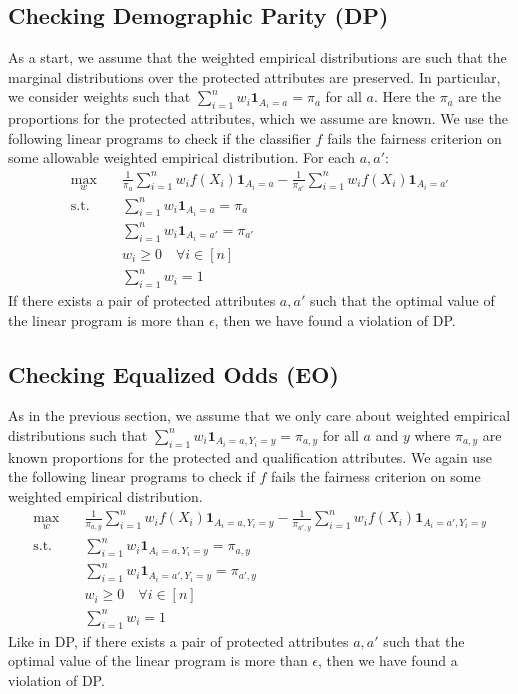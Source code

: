 \documentclass[11pt]{article}
\newcommand{\eye}{\mathbf{1}}
\begin{document}
\subsection{Checking Demographic Parity (DP)}
As a start, we assume that the weighted empirical distributions are such that the marginal distributions over the protected attributes are preserved. In particular, we consider weights such that $\sum_{i=1}^n w_i \eye_{A_i = a} = \pi_a$ for all $a$. Here the $\pi_a$ are the proportions for the protected attributes, which we assume are known. We use the following linear programs to check if the classifier $f$ fails the fairness criterion on some allowable weighted empirical distribution. For each $a, a'$:
\begin{equation}
\label{eq:checkdp}
\begin{aligned}
\max_w \quad & \frac{1}{\pi_a} \sum_{i=1}^n w_i f(X_i)\eye_{A_i = a} - \frac{1}{\pi_{a'}} \sum_{i=1}^n w_i f(X_i)\eye_{A_i = a'} \\
\textrm{s.t.} \quad & \sum_{i=1}^n w_i \eye_{A_i = a} = \pi_a \\
& \sum_{i=1}^n w_i \eye_{A_i = a'} = \pi_{a'} \\
& w_i \ge 0 \quad \forall i \in [n] \\
&\sum_{i=1}^n w_i = 1
\end{aligned}
\end{equation}
If there exists a pair of protected attributes $a,a'$ such that the optimal value of the linear program is more than $\epsilon$, then we have found a violation of DP.

\subsection{Checking Equalized Odds (EO)}
As in the previous section, we assume that we only care about weighted empirical distributions such that $\sum_{i=1}^n w_i \eye_{A_i = a, Y_i = y} = \pi_{a,y}$ for all $a$ and $y$ where $\pi_{a,y}$ are known proportions for the protected and qualification attributes. We again use the following linear programs to check if $f$ fails the fairness criterion on some weighted empirical distribution.
\begin{equation}
\label{eq:checkeo}
\begin{aligned}
\max_w \quad & \frac{1}{\pi_{a,y}} \sum_{i=1}^n w_i f(X_i)\eye_{A_i = a, Y_i = y} - \frac{1}{\pi_{a',y}} \sum_{i=1}^n w_i f(X_i)\eye_{A_i = a',Y_i = y} \\
\textrm{s.t.} \quad & \sum_{i=1}^n w_i \eye_{A_i = a, Y_i = y} = \pi_{a,y} \\
& \sum_{i=1}^n w_i \eye_{A_i = a', Y_i = y} = \pi_{a',y} \\
& w_i \ge 0 \quad \forall i \in [n] \\
&\sum_{i=1}^n w_i = 1
\end{aligned}
\end{equation}
Like in DP, if there exists a pair of protected attributes $a,a'$ such that the optimal value of the linear program is more than $\epsilon$, then we have found a violation of DP.
\end{document}
